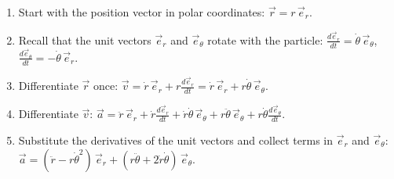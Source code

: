 \documentclass[11pt]{article}
\begin{document}
\begin{methode}
\begin{enumerate}
\item Start with the position vector in polar coordinates: $\vec{r} = r\,\vec{e}_r$.
\item Recall that the unit vectors $\vec{e}_r$ and $\vec{e}_\theta$ rotate with the particle: $\frac{d\vec{e}_r}{dt} = \dot{\theta}\,\vec{e}_\theta$, $\frac{d\vec{e}_\theta}{dt} = -\dot{\theta}\,\vec{e}_r$.
\item Differentiate $\vec{r}$ once: $\vec{v} = \dot{r}\,\vec{e}_r + r\frac{d\vec{e}_r}{dt} = \dot{r}\,\vec{e}_r + r\dot{\theta}\,\vec{e}_\theta$.
\item Differentiate $\vec{v}$: $\vec{a} = \ddot{r}\,\vec{e}_r + \dot{r}\frac{d\vec{e}_r}{dt} + \dot{r}\dot{\theta}\,\vec{e}_\theta + r\ddot{\theta}\,\vec{e}_\theta + r\dot{\theta}\frac{d\vec{e}_\theta}{dt}$.
\item Substitute the derivatives of the unit vectors and collect terms in $\vec{e}_r$ and $\vec{e}_\theta$:
$\vec{a} = (\ddot{r} - r\dot{\theta}^2)\,\vec{e}_r + (r\ddot{\theta} + 2\dot{r}\dot{\theta})\,\vec{e}_\theta$.
\end{enumerate}
\end{methode}
\end{document}
